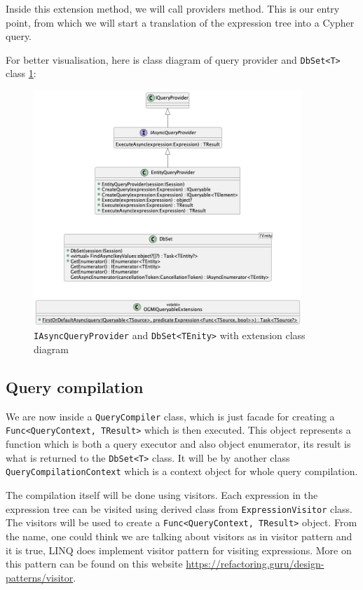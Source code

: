 Inside this extension method, we will call providers\linebreak
{} method. This is our entry point, from which we will start a translation
of the expression tree into a Cypher query.

For better visualisation, here is class diagram of query provider and \texttt{DbSet<T>} class \ref{fig:queryprovider}:

\begin{figure}[H]
    \centering
    \includegraphics[width=0.9\textwidth]{content/QueryProvider.png}
    \caption{\texttt{IAsyncQueryProvider} and \texttt{DbSet<TEnity>} with extension class diagram}
    \label{fig:queryprovider}
\end{figure}

\subsection{Query compilation}

We are now inside a \texttt{QueryCompiler} class, which is just facade for creating a \texttt{Func<QueryContext, TResult>} which is then executed.
This object represents a function which is both a query executor and also object enumerator, its result is what is returned to the \texttt{DbSet<T>} class.
It will be by another class \texttt{QueryCompilationContext} which is a context object for whole query compilation.

The compilation itself will be done using visitors. Each expression in the expression tree can be visited using derived class from \texttt{ExpressionVisitor} class.
The visitors will be used to create a \texttt{Func<QueryContext, TResult>} object. From the name, one could think we are talking about visitors as in visitor pattern and
it is true, LINQ does implement visitor pattern for visiting expressions. More on this pattern can be found on this website \url{https://refactoring.guru/design-patterns/visitor}.

